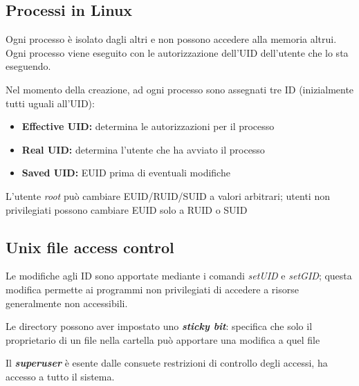 \subsection{Processi in Linux}
Ogni processo è isolato dagli altri e non possono accedere alla memoria altrui. Ogni processo viene 
eseguito con le autorizzazione dell'UID dell'utente che lo sta eseguendo. 

\noindent Nel momento della creazione, ad ogni processo sono assegnati tre ID (inizialmente tutti uguali 
all'UID):
\begin{itemize}
    \item \textbf{Effective UID:} determina le autorizzazioni per il processo 
    \item \textbf{Real UID:} determina l'utente che ha avviato il processo 
    \item \textbf{Saved UID:} EUID prima di eventuali modifiche
\end{itemize}

\noindent L'utente \textit{root} può cambiare EUID/RUID/SUID a valori arbitrari; utenti non privilegiati
possono cambiare EUID solo a RUID o SUID

\subsection{Unix file access control}
Le modifiche agli ID sono apportate mediante i comandi \textit{setUID} e \textit{setGID}; questa modifica 
permette ai programmi non privilegiati di accedere a risorse generalmente non accessibili.

\noindent Le directory possono aver impostato uno \textit{\textbf{sticky bit}}: specifica che solo il proprietario di un file nella cartella
può apportare una modifica a quel file 

\noindent Il \textit{\textbf{superuser}} è esente dalle consuete restrizioni di controllo degli accessi, ha 
accesso a tutto il sistema.



